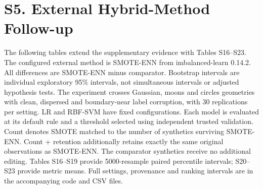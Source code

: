 \section*{S5. External Hybrid-Method Follow-up}
The following tables extend the supplementary evidence with Tables S16--S23. The configured external method is SMOTE-ENN from imbalanced-learn 0.14.2. All differences are SMOTE-ENN minus comparator. Bootstrap intervals are individual exploratory 95\% intervals, not simultaneous intervals or adjusted hypothesis tests.
The experiment crosses Gaussian, moons and circles geometries with clean, dispersed and boundary-near label corruption, with 30 replications per setting. LR and RBF-SVM have fixed configurations. Each model is evaluated at its default rule and a threshold selected using independent trusted validation. Count denotes SMOTE matched to the number of synthetics surviving SMOTE-ENN. Count + retention additionally retains exactly the same original observations as SMOTE-ENN. The comparator synthetics receive no additional editing. Tables S16--S19 provide 5000-resample paired percentile intervals; S20--S23 provide metric means. Full settings, provenance and ranking intervals are in the accompanying code and CSV files.

